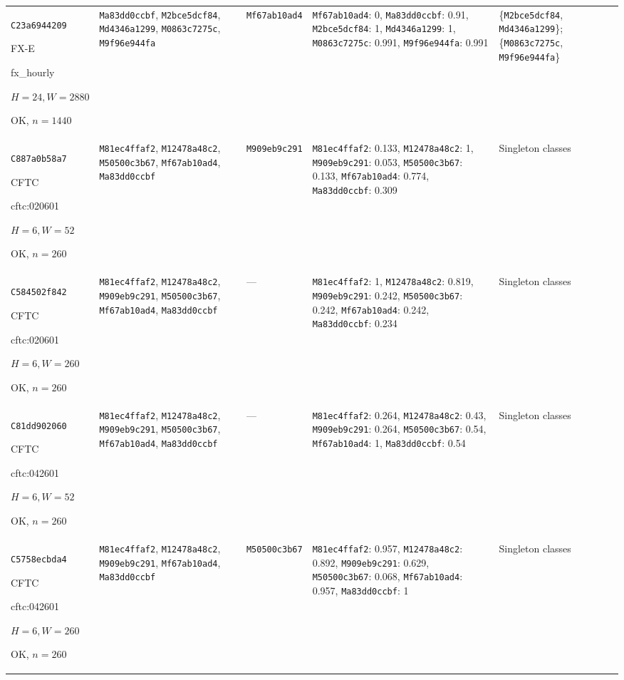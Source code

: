 \begin{longtable}{p{.15\linewidth}p{.17\linewidth}p{.17\linewidth}p{.25\linewidth}p{.14\linewidth}}
\texttt{C23a6944209}\par FX-E\par fx\_\allowbreak{}hourly\par $H=24,W=2880$\par OK, $n=1440$ & \texttt{Ma83dd0ccbf}, \texttt{M2bce5dcf84}, \texttt{Md4346a1299}, \texttt{M0863c7275c}, \texttt{M9f96e944fa} & \texttt{Mf67ab10ad4} & \texttt{Mf67ab10ad4}: 0, \texttt{Ma83dd0ccbf}: 0.91, \texttt{M2bce5dcf84}: 1, \texttt{Md4346a1299}: 1, \texttt{M0863c7275c}: 0.991, \texttt{M9f96e944fa}: 0.991 & \{\texttt{M2bce5dcf84}, \texttt{Md4346a1299}\}; \{\texttt{M0863c7275c}, \texttt{M9f96e944fa}\} \\
\texttt{C887a0b58a7}\par CFTC\par cftc:020601\par $H=6,W=52$\par OK, $n=260$ & \texttt{M81ec4ffaf2}, \texttt{M12478a48c2}, \texttt{M50500c3b67}, \texttt{Mf67ab10ad4}, \texttt{Ma83dd0ccbf} & \texttt{M909eb9c291} & \texttt{M81ec4ffaf2}: 0.133, \texttt{M12478a48c2}: 1, \texttt{M909eb9c291}: 0.053, \texttt{M50500c3b67}: 0.133, \texttt{Mf67ab10ad4}: 0.774, \texttt{Ma83dd0ccbf}: 0.309 & Singleton classes \\
\texttt{C584502f842}\par CFTC\par cftc:020601\par $H=6,W=260$\par OK, $n=260$ & \texttt{M81ec4ffaf2}, \texttt{M12478a48c2}, \texttt{M909eb9c291}, \texttt{M50500c3b67}, \texttt{Mf67ab10ad4}, \texttt{Ma83dd0ccbf} & --- & \texttt{M81ec4ffaf2}: 1, \texttt{M12478a48c2}: 0.819, \texttt{M909eb9c291}: 0.242, \texttt{M50500c3b67}: 0.242, \texttt{Mf67ab10ad4}: 0.242, \texttt{Ma83dd0ccbf}: 0.234 & Singleton classes \\
\texttt{C81dd902060}\par CFTC\par cftc:042601\par $H=6,W=52$\par OK, $n=260$ & \texttt{M81ec4ffaf2}, \texttt{M12478a48c2}, \texttt{M909eb9c291}, \texttt{M50500c3b67}, \texttt{Mf67ab10ad4}, \texttt{Ma83dd0ccbf} & --- & \texttt{M81ec4ffaf2}: 0.264, \texttt{M12478a48c2}: 0.43, \texttt{M909eb9c291}: 0.264, \texttt{M50500c3b67}: 0.54, \texttt{Mf67ab10ad4}: 1, \texttt{Ma83dd0ccbf}: 0.54 & Singleton classes \\
\texttt{C5758ecbda4}\par CFTC\par cftc:042601\par $H=6,W=260$\par OK, $n=260$ & \texttt{M81ec4ffaf2}, \texttt{M12478a48c2}, \texttt{M909eb9c291}, \texttt{Mf67ab10ad4}, \texttt{Ma83dd0ccbf} & \texttt{M50500c3b67} & \texttt{M81ec4ffaf2}: 0.957, \texttt{M12478a48c2}: 0.892, \texttt{M909eb9c291}: 0.629, \texttt{M50500c3b67}: 0.068, \texttt{Mf67ab10ad4}: 0.957, \texttt{Ma83dd0ccbf}: 1 & Singleton classes \\

\end{longtable}
